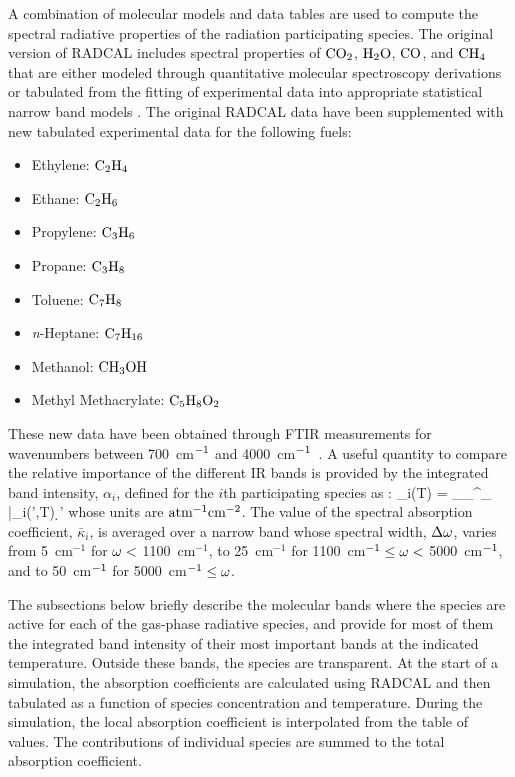 A combination of molecular models and data tables are used to compute the spectral radiative properties of the radiation participating species. The original version of RADCAL includes spectral properties of $\rm CO_2$, $\rm H_2O$, $\rm CO$, and $\rm CH_4$ that are either modeled through quantitative molecular spectroscopy derivations or tabulated from the fitting of experimental data into appropriate statistical narrow band models \cite{RadCal}. The original RADCAL data have been supplemented with new tabulated experimental data for the following fuels:
\begin{itemize}
  \item Ethylene:  $\rm C_2H_4$
  \item Ethane:    $\rm C_2H_6$
  \item Propylene: $\rm C_3H_6$
  \item Propane:   $\rm C_3H_8$
  \item Toluene:   $\rm C_7H_8$
  \item \textit{n}-Heptane: $\rm C_7H_{16}$
  \item Methanol:  $\rm CH_3OH$
  \item Methyl Methacrylate: $\rm C_5H_8O_2$
\end{itemize}
These new data have been obtained through FTIR measurements for wavenumbers between 700~cm$\rm ^{-1}$ and 4000~cm$\rm ^{-1}$~\cite{Wakatsuki:2005}. A useful quantity to compare the relative importance of the different IR bands is provided by the integrated band intensity, $\alpha_i$, defined for the $i$th participating species as \cite{Matheson:1932}:
\be
  \alpha_i(T) = \displaystyle\int_{\om_{\min}}^{\om_{\max}} \bar{\kappa}_i(\om',T) \; \d \om'
\ee
whose units are $\rm {atm^{-1} cm^{-2}}$. The value of the spectral absorption coefficient, $\bar{\kappa}_i$, is averaged over a narrow band whose spectral width, $\Delta \omega$, varies from 5~cm$^{-1}$ for $\omega < $ 1100~cm$^{-1}$, to 25~cm$^{-1}$ for 1100~cm$^{-1} \leq \omega < $ 5000~cm$^{\rm -1}$, and to 50~cm$^{\rm -1}$ for 5000~cm$^{\rm -1}\leq \omega$.

The subsections below briefly describe the molecular bands where the species are active for each of the gas-phase radiative species, and provide for most of them the integrated band intensity of their most important bands at the indicated temperature. Outside these bands, the species are transparent. At the start of a simulation, the absorption coefficients are calculated using RADCAL and then tabulated as a function of species concentration and temperature. During the simulation, the local absorption coefficient is interpolated from the table of values. The contributions of individual species are summed to the total absorption coefficient.



